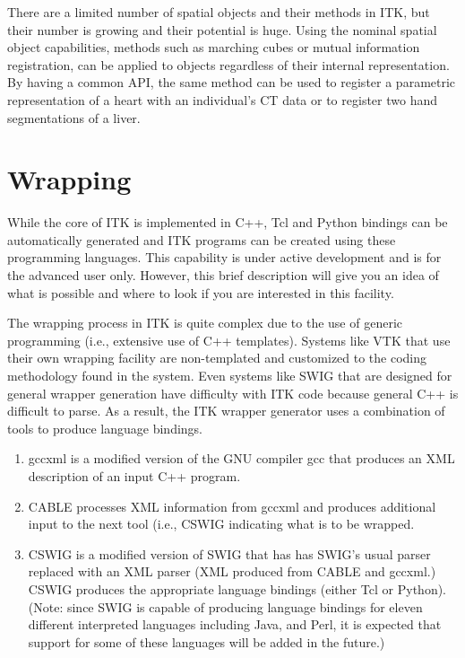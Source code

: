 There are a limited number of spatial objects and their methods in ITK, but
their number is growing and their potential is huge. Using the nominal
spatial object capabilities, methods such as marching cubes or mutual
information registration, can be applied to objects regardless of their
internal representation. By having a common API, the same method can be used
to register a parametric representation of a heart with an individual's CT
data or to register two hand segmentations of a liver.

%
%
%
\section{Wrapping}
\label{sec:Wrapping}


While the core of ITK is implemented in C++, Tcl and Python bindings can be
automatically generated and ITK programs can be created using these
programming languages. This capability is under active development and is for
the advanced user only. However, this brief description will give you an idea
of what is possible and where to look if you are interested in this facility.

The wrapping process in ITK is quite complex due to the use of generic
programming (i.e., extensive use of C++ templates). Systems like VTK that use
their own wrapping facility are non-templated and customized to the coding
methodology found in the system. Even systems like SWIG that are designed
for general wrapper generation have difficulty with ITK code because general
C++ is difficult to parse. As a result, the ITK wrapper generator uses a
combination of tools to produce language bindings.
\begin{enumerate}
  \item gccxml is a modified version of the GNU compiler gcc that
    produces an XML description of an input C++ program.
  \item  CABLE processes XML information from gccxml and produces
    additional input to the next tool (i.e., CSWIG indicating what is
    to be wrapped.
  \item CSWIG is a modified version of SWIG that has has SWIG's usual
    parser replaced with an XML parser (XML produced from CABLE and
    gccxml.) CSWIG produces the appropriate language bindings
    (either Tcl or Python). (Note: since SWIG is capable of producing
    language bindings for eleven different interpreted languages including
    Java, and Perl, it is expected that support for some of these languages
    will be added in the future.)
\end{enumerate}

